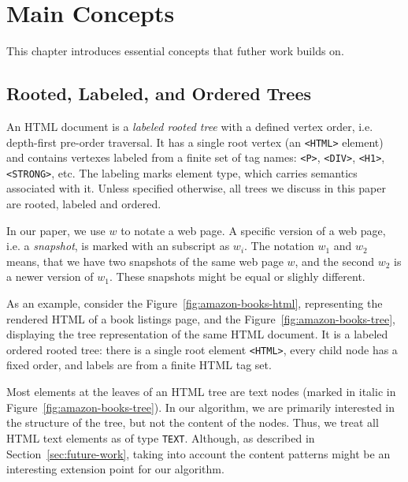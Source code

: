 \chapter{Main Concepts}

This chapter introduces essential concepts that futher work builds on.


\section{Rooted, Labeled, and Ordered Trees}

An HTML document is a \emph{labeled rooted tree} with a defined vertex order, i.e. depth-first pre-order traversal. It has a single root vertex (an \texttt{<HTML>} element) and contains vertexes labeled from a finite set of tag names: \texttt{<P>}, \texttt{<DIV>}, \texttt{<H1>}, \texttt{<STRONG>}, etc. The labeling marks element type, which carries semantics associated with it. Unless specified otherwise, all trees we discuss in this paper are rooted, labeled and ordered.

In our paper, we use $w$ to notate a web page. A specific version of a web page, i.e. a \emph{snapshot}, is marked with an subscript as $w_i$. The notation $w_1$ and $w_2$ means, that we have two snapshots of the same web page $w$, and the second $w_2$ is a newer version of $w_1$. These snapshots might be equal or slighly different.

As an example, consider the Figure~\ref{fig:amazon-books-html}, representing the rendered HTML of a book listings page, and the Figure~\ref{fig:amazon-books-tree}, displaying the tree representation of the same HTML document. It is a labeled ordered rooted tree: there is a single root element \texttt{<HTML>}, every child node has a fixed order, and labels are from a finite HTML tag set.

Most elements at the leaves of an HTML tree are text nodes (marked in italic in Figure~\ref{fig:amazon-books-tree}). In our algorithm, we are primarily interested in the structure of the tree, but not the content of the nodes. Thus, we treat all HTML text elements as of type \texttt{TEXT}. Although, as described in Section~\ref{sec:future-work}, taking into account the content patterns might be an interesting extension point for our algorithm.

